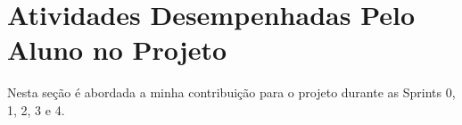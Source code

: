 \section[Atividades Desempenhadas Pelo Aluno no Projeto]{Atividades Desempenhadas Pelo Aluno no Projeto}

Nesta seção é abordada a minha contribuição para o projeto durante as Sprints 0, 1, 2, 3 e 4.






